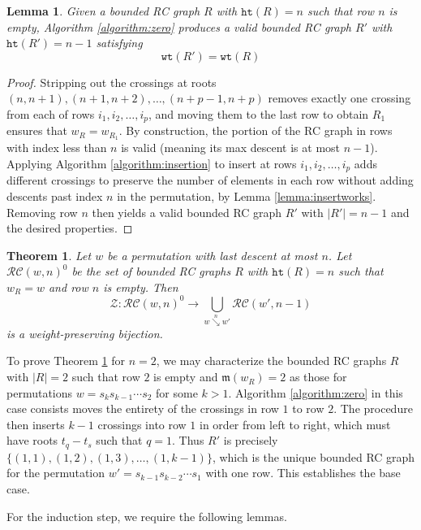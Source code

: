 \documentclass{amsart}
\newtheorem{lemma}{Lemma}[subsection]
\newtheorem{theorem}{Theorem}[section]
\theoremstyle{definition}
\theoremstyle{remark}
\numberwithin{equation}{subsection}
\newcommand{\downvar}[1]{\stackrel{#1}{\searrow}}
\newcommand{\wof}[1]{w_{#1}}
\newcommand{\wtt}{\mathtt{wt}}
\newcommand{\zeromap}{\mathcal{Z}}
\newcommand{\hr}{\mathtt{ht}}
\newcommand{\maxd}{\mathfrak{m}}
\begin{document}
\begin{lemma}
Given a bounded RC graph $R$ with $\hr(R)=n$ such that row $n$ is empty, Algorithm \ref{algorithm:zero} produces a valid bounded RC graph $R'$ with $\hr(R')=n-1$ satisfying
$$\wtt(R') = \wtt(R)$$
\end{lemma}
\begin{proof}
	Stripping out the crossings at roots $(n, n+1), (n+1, n+2), \ldots, (n + p - 1, n + p)$ removes exactly one crossing from each of rows $i_1, i_2, \ldots, i_p$, and moving them to the last row to obtain $R_1$ ensures that $\wof{R}=\wof{R_1}$. By construction, the portion of the RC graph in rows with index less than $n$ is valid (meaning its max descent is at most $n-1$). Applying Algorithm \ref{algorithm:insertion} to insert at rows $i_1, i_2, \ldots, i_p$ adds different crossings to preserve the number of elements in each row without adding descents past index $n$ in the permutation, by Lemma \ref{lemma:insertworks}. Removing row $n$ then yields a valid bounded RC graph $R'$ with $|R'|=n-1$ and the desired properties. 
\end{proof}



\begin{theorem} \label{theorem:zero_bijection}
Let $w$ be a permutation with last descent at most $n$. Let $\mathcal{RC}(w,n)^0$ be the set of bounded RC graphs $R$ with $\hr(R)=n$ such that $\wof{R}=w$ and row $n$ is empty. Then
$$\zeromap:\mathcal{RC}(w, n)^{0}\to \bigcup_{w\downvar{n} w'}\mathcal{RC}(w', n-1)$$
is a weight-preserving bijection.
\end{theorem}

To prove Theorem \ref{theorem:zero_bijection} for $n=2$, we may characterize the bounded RC graphs $R$ with $|R|=2$ such that row $2$ is empty and $\maxd(\wof{R})=2$ as those for permutations $w=s_k s_{k-1}\cdots s_2$ for some $k>1$. Algorithm \ref{algorithm:zero} in this case consists moves the entirety of the crossings in row $1$ to row $2$. The procedure then inserts $k-1$ crossings into row $1$ in order from left to right, which must have roots $t_q - t_s$ such that $q=1$. Thus $R'$ is precisely $\{(1,1), (1,2), (1,3), \ldots, (1, k-1)\}$, which is the unique bounded RC graph for the permutation $w' = s_{k-1} s_{k-2}\cdots s_1$ with one row. This establishes the base case.

For the induction step, we require the following lemmas.
\end{document}
